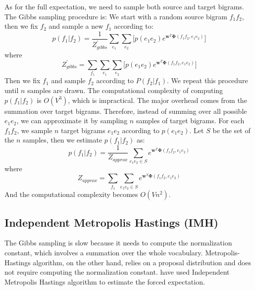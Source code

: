 As for the full expectation, we need to sample both source and target bigrams. The Gibbs sampling procedure is: We start with a random source bigram $f_1f_2$, then we fix $f_2$ and sample a new $f_1$ according to: 
\begin{equation}
p(f_1|f_2) = \frac{1}{Z_{gibbs}^\prime} \sum_{e_1} \sum_{e_2} \biggl [  p(e_1 e_2) e^{\mathbf{w}^T\mathbf{\Phi}(f_1f_2, e_1e_2)} \biggr ]
\end{equation}
where
\begin{equation}
Z_{gibbs}^\prime = \sum_{f_1} \sum_{e_1} \sum_{e_2} \biggl [ p(e_1 e_2)  e^{\mathbf{w}^T\mathbf{\Phi}(f_1f_2, e_1e_2)} \biggr ]
\end{equation}
Then we fix $f_1$ and sample $f_2$ according to $P(f_2|f_1)$. We repeat this procedure until $n$ samples are drawn.
The computational complexity of computing $p(f_1|f_2)$ is $O(V^3)$, which is impractical. 
The major overhead comes from the summation over target bigrams.
Therefore, instead of summing over all possible $e_1 e_2$, we can approximate it by sampling $n$ samples of target bigrams. 
For each $f_1f_2$, we sample $n$ target bigrams $e_1 e_2$ according to $p(e_1 e_2)$. 
Let $S$ be the set of the $n$ samples, then we estimate $p(f_1|f_2)$ as:
\begin{equation}
p(f_1|f_2) = \frac{1}{Z_{approx}} \sum_{e_1 e_2 \in S} e^{\mathbf{w}^T\mathbf{\Phi}(f_1f_2, e_1e_2)}
\end{equation}
where 
$$ Z_{approx} = \sum_{f_1} \sum_{e_1e_2 \in S} e^{\mathbf{w}^T\mathbf{\Phi}(f_1f_2, e_1e_2)} $$
And the computational complexity becomes $O(Vn^2)$. 
\subsection{Independent Metropolis Hastings (IMH)}
The Gibbs sampling is slow because it needs to compute the normalization constant, which involves a summation over the whole vocabulary. 
Metropolis-Hastings algorithm, on the other hand, relies on a proposal distribution and does not require computing the normalization constant. 
have used Independent Metropolis Hastings algorithm to estimate the forced expectation.


